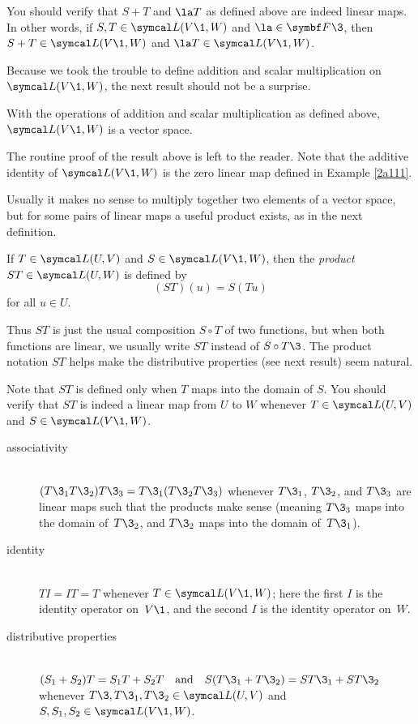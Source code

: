 
You should verify that $S+T$ and $\la T$ as defined above are indeed linear maps. In other words, if $S, T \in \L(V\1,W)$ and $\la \in \F{}\3$, then $S+T \in \L(V\1, W)$ and $\la T \in \L(V\1, W)$.

Because we took the trouble to define addition and scalar multiplication on $\L(V\1,W)$, the next result should not be a surprise.

{With the operations of addition and scalar multiplication as defined above, $\L(V\1,W)$ is a vector space.}

The routine proof of the result above is left to the reader. Note that the
additive identity of $\L(V\1,W)$ is the zero  linear map defined in Example \ref{2a111}.

Usually it makes no sense to multiply together two elements of a vector
space, but for some pairs of linear maps a useful product exists, as in the next definition.

{If $T \in \L(U,V)$ and $S \in \L(V\1,W)$, then the \emph{product} $ST \in \L(U,W)$ is defined by
\[
(ST)(u) = S(Tu)
\]
for all $u \in U$.}

Thus $ST$ is just the usual composition $S \circ T$  of two functions, but when both functions are linear, we usually write $ST$ instead of $S \circ T\3$. The product notation $ST$ helps make the distributive properties (see next result) seem natural.

Note that $ST$ is defined only when $T$ maps into the domain of $S$. You should verify that $ST$ is indeed a linear map from $U$ to $W$ whenever $T \in \L(U,V)$ and $S \in \L(V\1,W)$.

{\begin{description}
\item[associativity] \ \\
$
(T\3_1T\3_2)T\3_3 = T\3_1(T\3_2T\3_3)$
whenever $T\3_1$, $T\3_2$, and $T\3_3$ are linear
maps such that the products make sense (meaning $T\3_3$ maps into
the domain of~$T\3_2$, and $T\3_2$ maps into the domain of~$T\3_1$).

\item[identity] \ \\
$
TI = IT = T
$
whenever $T \in \L(V\1,W)$; here the first $I$ is the identity operator on~$V\1$, and the second $I$ is the identity operator
on~$W$.

\item[distributive properties] \ \\
$
(S_1 + S_2) T = S_1 T + S_2 T \andd S(T\3_1 + T\3_2) = ST\3_1 + ST\3_2
$
whenever
$T\3,T\3_1,T\3_2 \in \L(U,V)$ and $S, S_1, S_2 \in \L(V\1,W)$.
\end{description}
}

